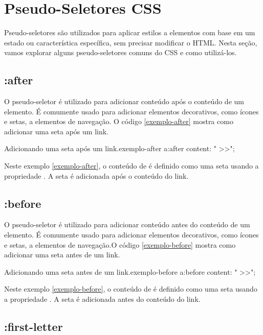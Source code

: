 \section{Pseudo-Seletores CSS}

Pseudo-seletores são utilizados para aplicar estilos a elementos com base em um estado ou característica específica, sem precisar modificar o HTML. Nesta seção, vamos explorar alguns pseudo-seletores comuns do CSS e como utilizá-los.

\subsection{:after}

O pseudo-seletor  é utilizado para adicionar conteúdo após o conteúdo de um elemento. É comumente usado para adicionar elementos decorativos, como ícones e setas, a elementos de navegação. O código \ref{exemplo-after} mostra como adicionar uma seta após um link.

\begin{csscode}{Adicionando uma seta após um link.}{exemplo-after}
a:after {
    content: " >>";
}
\end{csscode}

Neste exemplo \ref{exemplo-after}, o conteúdo de  é definido como uma seta usando a propriedade . A seta é adicionada após o conteúdo do link.

\subsection{:before}

O pseudo-seletor  é utilizado para adicionar conteúdo antes do conteúdo de um elemento. É comumente usado para adicionar elementos decorativos, como ícones e setas, a elementos de navegação.O código \ref{exemplo-before} mostra como adicionar uma seta antes de um link.

\begin{csscode}{Adicionando uma seta antes de um link.}{exemplo-before}
a:before {
    content: " >>";
}
\end{csscode}

Neste exemplo \ref{exemplo-before}, o conteúdo de  é definido como uma seta usando a propriedade . A seta é adicionada antes do conteúdo do link.

\subsection{:first-letter}

